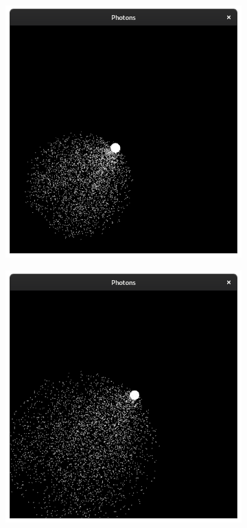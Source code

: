 \documentclass{stdlocal}
\begin{document}
\begin{figure}[p]
\begin{subfigure}[b]{0.24\textwidth}
      \end{subfigure}
      \begin{subfigure}[b]{0.24\textwidth}
        \center
        \includegraphics[width=\textwidth,trim={0 0 0 2cm},clip]{images/photons_2_04.png}
      \end{subfigure}
      \begin{subfigure}[b]{0.24\textwidth}
        \center
        \includegraphics[width=\textwidth,trim={0 0 0 2cm},clip]{images/photons_2_05.png}

\end{subfigure}
\end{figure}
\end{document}
